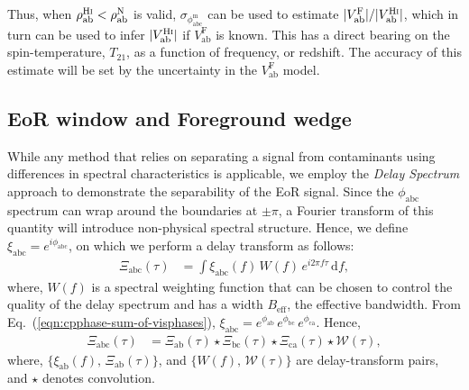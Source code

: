 \documentclass[
reprint,
superscriptaddress,
amsmath,
amssymb,
aps,
]{revtex4-1}
\begin{document}
Thus, when $\rho_\textrm{ab}^\textrm{H{\sc i}} < \rho_\textrm{ab}^\textrm{N}$ is valid, $\sigma_{\phi_\textrm{abc}^\textrm{m}}$ can be used to estimate $|V_\textrm{ab}^\textrm{F}|/|V_\textrm{ab}^\textrm{H{\sc i}}|$, which in turn can be used to infer $|V_\textrm{ab}^\textrm{H{\sc i}}|$ if $V_\textrm{ab}^\textrm{F}$ is known. This has a direct bearing on the spin-temperature, $T_{21}$, as a function of frequency, or redshift. The accuracy of this estimate will be set by the uncertainty in the $V_\textrm{ab}^\textrm{F}$ model.


\subsection{EoR window and Foreground wedge}\label{sec:cp-FG-wedge}

While any method that relies on separating a signal from contaminants using differences in spectral characteristics is applicable, we employ the {\it Delay Spectrum} approach \cite{par12a,par12b} to demonstrate the separability of the EoR signal. Since the $\phi_\textrm{abc}$ spectrum can wrap around the boundaries at $\pm\pi$, a Fourier transform of this quantity will introduce non-physical spectral structure. Hence, we define $\xi_\textrm{abc} = e^{i\phi_\textrm{abc}}$, on which we perform a delay transform as follows:
\begin{align}
  \Xi_\textrm{abc}(\tau) &= \int \xi_\textrm{abc}(f)\,W(f)\,e^{i2\pi f\tau}\,\mathrm{d}f,
\end{align}
where, $W(f)$ is a spectral weighting function that can be chosen to control the quality of the delay spectrum \citep{thy13,thy16} and has a width $B_\textrm{eff}$, the effective bandwidth. From Eq.~(\ref{eqn:cpphase-sum-of-visphases}), $\xi_\textrm{abc} = e^{\phi_\textrm{ab}}\,e^{\phi_\textrm{bc}}\,e^{\phi_\textrm{ca}}$. Hence,
\begin{align}
  \Xi_\textrm{abc}(\tau) &= \Xi_\textrm{ab}(\tau) \star \Xi_\textrm{bc}(\tau) \star \Xi_\textrm{ca}(\tau) \star \mathcal{W}(\tau), \label{eqn:cpdspec-convolution}
\end{align}
where, $\{\xi_\textrm{ab}(f),\,\Xi_\textrm{ab}(\tau)\}$, and $\{W(f),\,\mathcal{W}(\tau)\}$ are delay-transform pairs, and $\star$ denotes convolution. 
\end{document}
